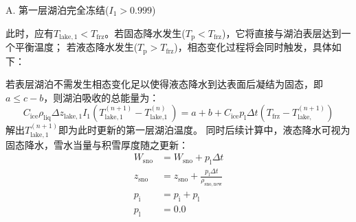 A. 第一层湖泊完全冻结($I_1>0.999$)

此时，应有$T_{\mathrm{lake,1}}<T_{\mathrm {frz}} $。若固态降水发生($T_{\mathrm {p}} <T_{\mathrm {frz}} $)，它将直接与湖泊表层达到一个平衡温度；
若液态降水发生($T_{\mathrm {p}} >T_{\mathrm {frz}} $)，相态变化过程将会同时触发，具体如下：

若表层湖泊不需发生相态变化足以使得液态降水到达表面后凝结为固态，即$a\leqslant c-b$，则湖泊吸收的总能量为：
\begin{equation}
  C_{\mathrm{ice}} \rho_{\mathrm{liq}} \Delta z_{\mathrm{lake,1}} I_{1}\left(T_{\mathrm{lake, 1}}^{(n+1)}-T_{\text {lake,1 }}^{(n)}\right)=a+b+C_{\mathrm{ice}} p_{\mathrm{l}} \Delta t\left(T_{\mathrm {frz}}-T_{\text {lake, }}^{(n+1)}\right)
\end{equation}
解出$T_{\mathrm{lake,1}}^{\left(n+1\right)}$即为此时更新的第一层湖泊温度。
同时后续计算中，液态降水可视为固态降水，雪水当量与积雪厚度随之更新：
\begin{equation}
  \begin{aligned}
    W_{\mathrm{sno}} &= W_{\mathrm{sno}}+p_{\mathrm {l}}  \Delta t \\
    z_{\mathrm{sno}} &= z_{\mathrm{sno}}+\frac{p_{\mathrm {l}}  \Delta t}{\rho_{\mathrm{sno,new}}} \\
    p_{\mathrm {i}}  &= p_{\mathrm {i}}  + p_{\mathrm {l}}  \\
    p_{\mathrm {l}}  &= 0.0
  \end{aligned}
\end{equation}


